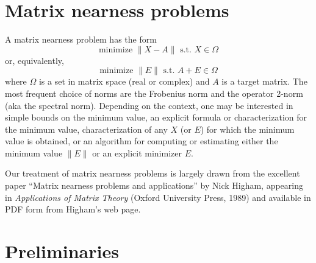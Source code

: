 \documentclass[12pt, leqno]{article} %
\begin{document}


\section{Matrix nearness problems}

A matrix nearness problem has the form
\[
  \mbox{minimize } \|X-A\| \mbox{ s.t.~} X \in \Omega
\]
or, equivalently,
\[
  \mbox{minimize } \|E\| \mbox{ s.t.~} A+E \in \Omega
\]
where $\Omega$ is a set in matrix space (real or complex) and $A$ is a
target matrix.  The most frequent choice of norms are the Frobenius
norm and the operator 2-norm (aka the spectral norm).
Depending on the context, one may be interested in simple bounds on
the minimum value, an explicit formula or characterization for the
minimum value, characterization of any $X$ (or $E$) for which the
minimum value is obtained, or an algorithm for computing or estimating
either the minimum value $\|E\|$ or an explicit minimizer $E$.

Our treatment of matrix nearness problems is largely drawn from the
excellent paper ``Matrix nearness problems and applications'' by Nick
Higham, appearing in {\em Applications of Matrix Theory} (Oxford
University Press, 1989) and available in PDF form from Higham's web
page.

\section{Preliminaries}
\end{document}
